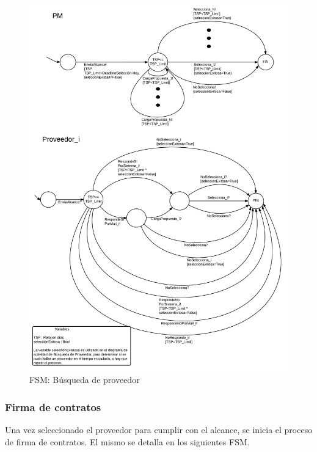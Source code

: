 \begin{figure}[H]
\centering
\includegraphics[width=0.8\linewidth]{diag/nuevos/fsm-selprov.png}
\caption{FSM: Búsqueda de proveedor}
\label{fsm-selprov}
\end{figure}


		\subsubsection{Firma de contratos}
Una vez seleccionado el proveedor para cumplir con el alcance, se inicia 
el proceso de firma de contratos. El mismo se detalla en los siguientes FSM. 


